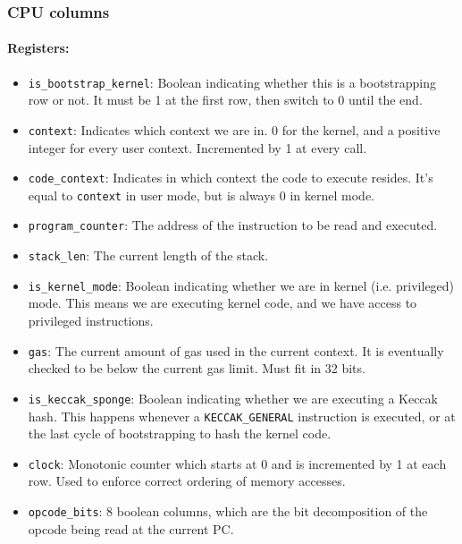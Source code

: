 \subsubsection{CPU columns}

\paragraph*{Registers:} \begin{itemize}
    \item \texttt{is\_bootstrap\_kernel}: Boolean indicating whether this is a bootstrapping row or not. It must be 1 at the first row, then switch to 0 until the end.
    \item \texttt{context}: Indicates which context we are in. 0 for the kernel, and a positive integer for every user context. Incremented by 1 at every call.
    \item \texttt{code\_context}: Indicates in which context the code to execute resides. It's equal to \texttt{context} in user mode, but is always 0 in kernel mode.
    \item \texttt{program\_counter}: The address of the instruction to be read and executed.
    \item \texttt{stack\_len}: The current length of the stack.
    \item \texttt{is\_kernel\_mode}: Boolean indicating whether we are in kernel (i.e. privileged) mode. This means we are executing kernel code, and we have access to
privileged instructions.
    \item \texttt{gas}: The current amount of gas used in the current context. It is eventually checked to be below the current gas limit. Must fit in 32 bits.
    \item \texttt{is\_keccak\_sponge}: Boolean indicating whether we are executing a Keccak hash. This happens whenever a \texttt{KECCAK\_GENERAL} instruction is executed, or at the last
cycle of bootstrapping to hash the kernel code.
    \item \texttt{clock}: Monotonic counter which starts at 0 and is incremented by 1 at each row. Used to enforce correct ordering of memory accesses. 
    \item \texttt{opcode\_bits}: 8 boolean columns, which are the bit decomposition of the opcode being read at the current PC.
\end{itemize}

